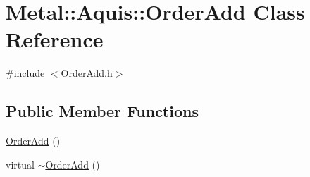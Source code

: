 \hypertarget{classMetal_1_1Aquis_1_1OrderAdd}{}\section{Metal\+:\+:Aquis\+:\+:Order\+Add Class Reference}
\label{classMetal_1_1Aquis_1_1OrderAdd}


{\ttfamily \#include $<$Order\+Add.\+h$>$}

\subsection*{Public Member Functions}
\begin{DoxyCompactItemize}
\item 
\hyperlink{classMetal_1_1Aquis_1_1OrderAdd_a019321c8f9ec0df43faabeb55f7eb0e3}{Order\+Add} ()
\item 
virtual \hyperlink{classMetal_1_1Aquis_1_1OrderAdd_ae5878f9b73b48d8d1b3f135e7fe24eb2}{$\sim$\+Order\+Add} ()
\end{DoxyCompactItemize}
